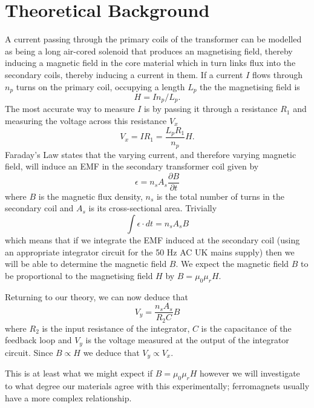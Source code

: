 \documentclass[12pt]{article}
\begin{document}
\section{Theoretical Background}
A current passing through the primary coils of the transformer can be modelled as being a long air-cored solenoid that produces an magnetising field, thereby inducing a magnetic field in the core material which in turn links flux into the secondary coils, thereby inducing a current in them. If a current $I$ flows through $n_p$ turns on the primary coil, occupying a length $L_p$ the the magnetising field is \cite{labmanual}
\begin{equation}
H = In_p / L_p.
\end{equation}
The most accurate way to measure $I$ is by passing it through a resistance $R_1$ and measuring the voltage across this resistance $V_x$
\begin{equation}
V_x = IR_1 = \frac{L_p R_1}{n_p}H.
\end{equation}
Faraday's Law states that the varying current, and therefore varying magnetic field, will induce an EMF in the secondary transformer coil given by \cite{feynman2}
\begin{equation}
\epsilon = n_s A_s \frac{\partial B}{\partial t}
\end{equation}
where $B$ is the magnetic flux density, $n_s$ is the total number of turns in the secondary coil and $A_s$ is its cross-sectional area. Trivially
\begin{equation}
\int \epsilon \cdot dt = n_s A_s B
\end{equation}
which means that if we integrate the EMF induced at the secondary coil (using an appropriate integrator circuit for the 50 Hz AC UK mains supply) then we will be able to determine the magnetic field $B$. We expect the magnetic field $B$ to be proportional to the magnetising field $H$ by $B = \mu_0 \mu_r H$.

Returning to our theory, we can now deduce that
\begin{equation}
V_y = \frac{n_s A_s}{R_2 C} B
\end{equation}
where $R_2$ is the input resistance of the integrator, $C$ is the capacitance of the feedback loop and $V_y$ is the voltage measured at the output of the integrator circuit. Since $B \propto H$ we deduce that $V_y \propto V_x$.

This is at least what we might expect if $B = \mu _0 \mu _r H$ however we will investigate to what degree our materials agree with this experimentally; ferromagnets usually have a more complex relationship. \cite{tilley2005}
\end{document}
